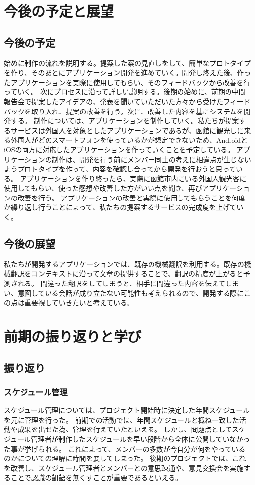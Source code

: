 \documentclass[openany,11pt,papersize]{jsbook}
\begin{document}
\chapter{今後の予定と展望}

\section{今後の予定}
 始めに制作の流れを説明する。提案した案の見直しをして、簡単なプロトタイプを作り、そのあとにアプリケーション開発を進めていく。開発し終えた後、作ったアプリケーションを実際に使用してもらい、そのフィードバックから改善を行っていく。
次にプロセスに沿って詳しい説明する。後期の始めに、前期の中間報告会で提案したアイデアの、発表を聞いていただいた方々から受けたフィードバックを取り入れ、提案の改善を行う。次に、改善した内容を基にシステムを開発する。
制作については、アプリケーションを制作していく。私たちが提案するサービスは外国人を対象としたアプリケーションであるが、函館に観光しに来る外国人がどのスマートフォンを使っているかが想定できないため、AndroidとiOSの両方に対応したアプリケーションを作っていくことを予定している。
アプリケーションの制作は、開発を行う前にメンバー同士の考えに相違点が生じないようプロトタイプを作って、内容を確認し合ってから開発を行おうと思っている。
アプリケーションを作り終ったら、実際に函館市内にいる外国人観光客に使用してもらい、使った感想や改善した方がいい点を聞き、再びアプリケーションの改善を行う。
アプリケーションの改善と実際に使用してもらうことを何度か繰り返し行うことによって、私たちの提案するサービスの完成度を上げていく。

\section{今後の展望}
 私たちが開発するアプリケーションでは、既存の機械翻訳を利用する。既存の機械翻訳をコンテキストに沿って文章の提供することで、翻訳の精度が上がると予測される。
 間違った翻訳をしてしまうと、相手に間違った内容を伝えてしまい、意図している会話が成り立たない可能性も考えられるので、開発する際にこの点は重要視していきたいと考えている。



\chapter{前期の振り返りと学び}
\section{振り返り}
\subsection{スケジュール管理}
 スケジュール管理については、プロジェクト開始時に決定した年間スケジュールを元に管理を行った。
前期での活動では、年間スケジュールと概ね一致した活動や成果を出せた為、管理を行えていたといえる。
しかし、問題点としてスケジュール管理者が制作したスケジュールを早い段階から全体に公開していなかった事が挙げられる。
これによって、メンバーの多数が今自分が何をやっているのかについての理解に時間を要してしまった。
後期のプロジェクトでは、これを改善し、スケジュール管理者とメンバーとの意思疎通や、意見交換会を実施することで認識の齟齬を無くすことが重要であるといえる。
\end{document}
